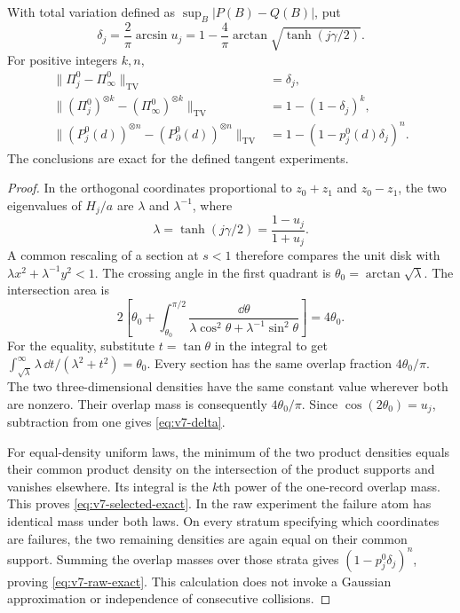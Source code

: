 \begin{proposition}\label{prop:v7-overlap}
With total variation defined as $\sup_B|P(B)-Q(B)|$, put
\begin{equation}\label{eq:v7-delta}
 \delta_j=\frac2\pi\arcsin u_j
 =1-\frac4\pi\arctan\sqrt{\tanh(j\gamma/2)}.
\end{equation}
For positive integers $k,n$,
\begin{align}
 \|\Pi_j^0-\Pi_\infty^0\|_{\mathrm{TV}}&=\delta_j,\label{eq:v7-single-tv}\\
 \|(\Pi_j^0)^{\otimes k}-(\Pi_\infty^0)^{\otimes k}\|_{\mathrm{TV}}
       &=1-(1-\delta_j)^k,\label{eq:v7-selected-exact}\\
 \|(P_j^0(d))^{\otimes n}-(P_\partial^0(d))^{\otimes n}\|_{\mathrm{TV}}
       &=1-(1-p_j^0(d)\delta_j)^n.\label{eq:v7-raw-exact}
\end{align}
The conclusions are exact for the defined tangent experiments.
\end{proposition}
\begin{proof}
In the orthogonal coordinates proportional to $z_0+z_1$ and $z_0-z_1$, the two eigenvalues of $H_j/a$ are $\lambda$ and $\lambda^{-1}$, where
\[
 \lambda=\tanh(j\gamma/2)=\frac{1-u_j}{1+u_j}.
\]
A common rescaling of a section at $s<1$ therefore compares the unit disk with $\lambda x^2+\lambda^{-1}y^2<1$. The crossing angle in the first quadrant is $\theta_0=\arctan\sqrt\lambda$. The intersection area is
\[
 2\left[\theta_0+\int_{\theta_0}^{\pi/2}
 \frac{\dd\theta}{\lambda\cos^2\theta+\lambda^{-1}\sin^2\theta}\right]
 =4\theta_0.
\]
For the equality, substitute $t=\tan\theta$ in the integral to get
$\int_{\sqrt\lambda}^{\infty}\lambda\,\dd t/(\lambda^2+t^2)=\theta_0$.
Every section has the same overlap fraction $4\theta_0/\pi$. The two three-dimensional densities have the same constant value wherever both are nonzero. Their overlap mass is consequently $4\theta_0/\pi$. Since $\cos(2\theta_0)=u_j$, subtraction from one gives \eqref{eq:v7-delta}.

For equal-density uniform laws, the minimum of the two product densities equals their common product density on the intersection of the product supports and vanishes elsewhere. Its integral is the $k$th power of the one-record overlap mass. This proves \eqref{eq:v7-selected-exact}. In the raw experiment the failure atom has identical mass under both laws. On every stratum specifying which coordinates are failures, the two remaining densities are again equal on their common support. Summing the overlap masses over those strata gives $(1-p_j^0\delta_j)^n$, proving \eqref{eq:v7-raw-exact}. This calculation does not invoke a Gaussian approximation or independence of consecutive collisions.
\end{proof}

